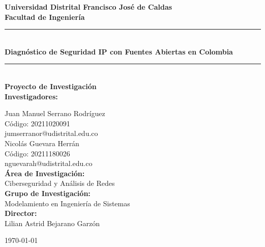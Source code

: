 \begin{titlepage}
\centering
\vspace*{1cm}

\textbf{\Large Universidad Distrital Francisco José de Caldas}\\
\textbf{\large Facultad de Ingeniería}\\
\vspace{1cm}

\rule{\linewidth}{0.2mm} \\[0.4cm]
{\huge \bfseries Diagnóstico de Seguridad IP con Fuentes Abiertas en Colombia}\\
\rule{\linewidth}{0.2mm} \\[0.4cm]

{\large \textbf{Proyecto de Investigación}}\\[1cm]

{\large \textbf{Investigadores:}}\\
\vspace{0.5cm}

Juan Manuel Serrano Rodríguez\\
Código: 20211020091\\
jumserranor@udistrital.edu.co\\[1cm]
Nicolás Guevara Herrán\\
Código: 20211180026\\
nguevarah@udistrital.edu.co\\[0.5cm]

{\large \textbf{Área de Investigación:}}\\
Ciberseguridad y Análisis de Redes\\[0.5cm]

{\large \textbf{Grupo de Investigación:}}\\
Modelamiento en Ingeniería de Sistemas\\[0.5cm]

{\large \textbf{Director:}}\\
Lilian Astrid Bejarano Garzón\\[0.5cm]

\vfill

{\large \today}

\end{titlepage}
